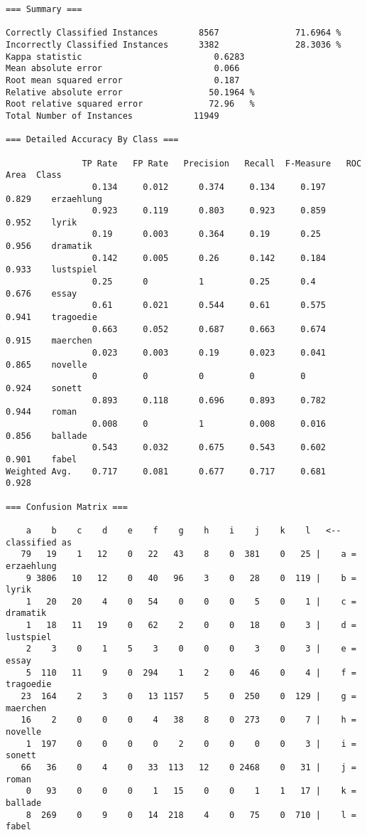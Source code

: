 \documentclass[]{article}
\begin{document}
\begin{verbatim}
=== Summary ===

Correctly Classified Instances        8567               71.6964 %
Incorrectly Classified Instances      3382               28.3036 %
Kappa statistic                          0.6283
Mean absolute error                      0.066
Root mean squared error                  0.187
Relative absolute error                 50.1964 %
Root relative squared error             72.96   %
Total Number of Instances            11949     

=== Detailed Accuracy By Class ===

               TP Rate   FP Rate   Precision   Recall  F-Measure   ROC Area  Class
                 0.134     0.012      0.374     0.134     0.197      0.829    erzaehlung
                 0.923     0.119      0.803     0.923     0.859      0.952    lyrik
                 0.19      0.003      0.364     0.19      0.25       0.956    dramatik
                 0.142     0.005      0.26      0.142     0.184      0.933    lustspiel
                 0.25      0          1         0.25      0.4        0.676    essay
                 0.61      0.021      0.544     0.61      0.575      0.941    tragoedie
                 0.663     0.052      0.687     0.663     0.674      0.915    maerchen
                 0.023     0.003      0.19      0.023     0.041      0.865    novelle
                 0         0          0         0         0          0.924    sonett
                 0.893     0.118      0.696     0.893     0.782      0.944    roman
                 0.008     0          1         0.008     0.016      0.856    ballade
                 0.543     0.032      0.675     0.543     0.602      0.901    fabel
Weighted Avg.    0.717     0.081      0.677     0.717     0.681      0.928

=== Confusion Matrix ===

    a    b    c    d    e    f    g    h    i    j    k    l   <-- classified as
   79   19    1   12    0   22   43    8    0  381    0   25 |    a = erzaehlung
    9 3806   10   12    0   40   96    3    0   28    0  119 |    b = lyrik
    1   20   20    4    0   54    0    0    0    5    0    1 |    c = dramatik
    1   18   11   19    0   62    2    0    0   18    0    3 |    d = lustspiel
    2    3    0    1    5    3    0    0    0    3    0    3 |    e = essay
    5  110   11    9    0  294    1    2    0   46    0    4 |    f = tragoedie
   23  164    2    3    0   13 1157    5    0  250    0  129 |    g = maerchen
   16    2    0    0    0    4   38    8    0  273    0    7 |    h = novelle
    1  197    0    0    0    0    2    0    0    0    0    3 |    i = sonett
   66   36    0    4    0   33  113   12    0 2468    0   31 |    j = roman
    0   93    0    0    0    1   15    0    0    1    1   17 |    k = ballade
    8  269    0    9    0   14  218    4    0   75    0  710 |    l = fabel
\end{verbatim}
\end{document}
